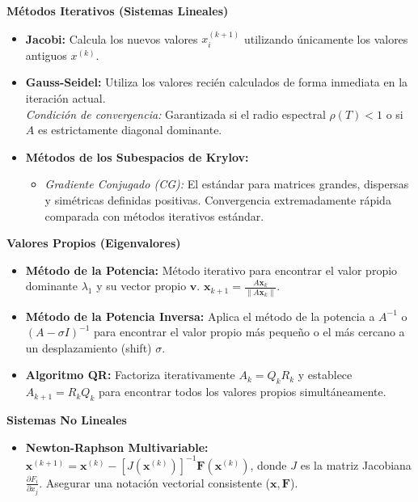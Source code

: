 \documentclass[10pt, landscape, twocolumn]{article}
\newcommand{\cheatsheetsubsection}[1]{
    \vspace{0.4em}
    {\color{themeblue}\normalsize\bfseries #1} \par
    \vspace{0.1em}
}
\begin{document}
\cheatsheetsubsection{Métodos Iterativos (Sistemas Lineales)}
\begin{itemize}[leftmargin=*, nosep]
    \item \textbf{Jacobi:} Calcula los nuevos valores $x_i^{(k+1)}$ utilizando únicamente los valores antiguos $x^{(k)}$.
    \item \textbf{Gauss-Seidel:} Utiliza los valores recién calculados de forma inmediata en la iteración actual. \\
    \textit{Condición de convergencia:} Garantizada si el radio espectral $\rho(T) < 1$ o si $A$ es estrictamente diagonal dominante.
    \item \textbf{Métodos de los Subespacios de Krylov:} 
    \begin{itemize}[leftmargin=*, nosep]
        \item \textit{Gradiente Conjugado (CG):} El estándar para matrices grandes, dispersas y simétricas definidas positivas. Convergencia extremadamente rápida comparada con métodos iterativos estándar.
    \end{itemize}
\end{itemize}

\cheatsheetsubsection{Valores Propios (Eigenvalores)}
\begin{itemize}[leftmargin=*, nosep]
    \item \textbf{Método de la Potencia:} Método iterativo para encontrar el valor propio dominante $\lambda_1$ y su vector propio $\mathbf{v}$. 
    $\mathbf{x}_{k+1} = \frac{A \mathbf{x}_k}{\|A \mathbf{x}_k\|}$.
    \item \textbf{Método de la Potencia Inversa:} Aplica el método de la potencia a $A^{-1}$ o $(A - \sigma I)^{-1}$ para encontrar el valor propio más pequeño o el más cercano a un desplazamiento (shift) $\sigma$.
    \item \textbf{Algoritmo QR:} Factoriza iterativamente $A_k = Q_k R_k$ y establece $A_{k+1} = R_k Q_k$ para encontrar todos los valores propios simultáneamente.
\end{itemize}

\cheatsheetsubsection{Sistemas No Lineales}
\begin{itemize}[leftmargin=*, nosep]
    \item \textbf{Newton-Raphson Multivariable:} $\mathbf{x}^{(k+1)} = \mathbf{x}^{(k)} - [J(\mathbf{x}^{(k)})]^{-1} \mathbf{F}(\mathbf{x}^{(k)})$, donde $J$ es la matriz Jacobiana $\frac{\partial F_i}{\partial x_j}$. Asegurar una notación vectorial consistente ($\mathbf{x}, \mathbf{F}$).
\end{itemize}
\end{document}
